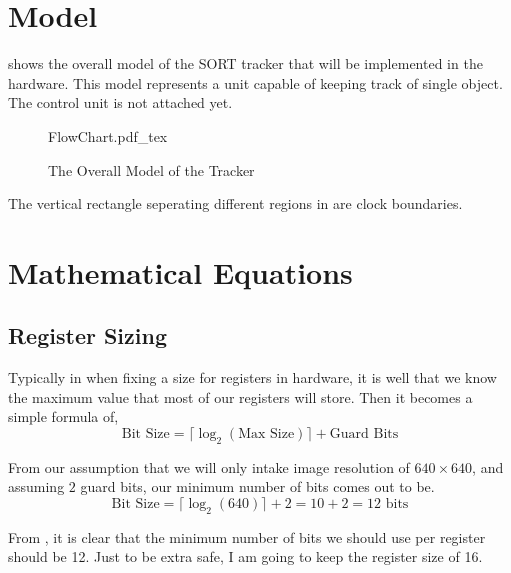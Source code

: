 \documentclass[10pt]{article}
\begin{document}
    \newpage
    \section{Model}

     shows the overall model of the SORT tracker that will be implemented in the hardware. This model represents a unit capable of keeping 
    track of single object. The control unit is not attached yet.

    \begin{figure}[h]
        \centering
        \def\svgwidth{\linewidth}
        {FlowChart.pdf_tex}
        \caption{The Overall Model of the Tracker}
        \label{fig:Overall_Model}
    \end{figure}
    
    \noindent The vertical rectangle seperating different regions in  are clock boundaries.

    \section{Mathematical Equations}
    \subsection{Register Sizing}

    Typically in when fixing a size for registers in hardware, it is well that we know the maximum value that most of our registers will store. Then it becomes a simple formula 
    of, 
    \begin{equation}
        \text{Bit Size} = \lceil \log_2(\text{Max Size}) \rceil + \text{Guard Bits}
        \label{Eq:General_Bit_Size}
    \end{equation}

    \noindent From our assumption that we will only intake image resolution of \(640 \times 640\), and assuming \(2\) guard bits, our minimum number of bits comes out to be.
    \begin{equation}
        \text{Bit Size} = \lceil \log_2(640) \rceil + 2 = 10 + 2 = 12 \text{ bits}
        \label{Eq:Bit_Size}
    \end{equation}
    
    \noindent From , it is clear that the minimum number of bits we should use per register should be 12. Just to be extra safe, I am going to 
    keep the register size of 16.
\end{document}

